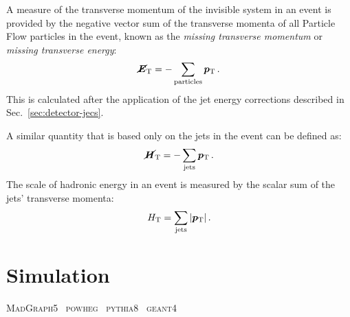 A measure of the transverse momentum of the invisible system in an event is 
provided by the negative vector sum of the transverse momenta of all Particle 
Flow particles in the event, known as the \textit{missing transverse momentum} 
or \textit{missing transverse energy}:
\begin{equation}
\bm{\cancel{E}}_\mathrm{T} = - \sum_{\mathrm{particles}} \bm{p}_\mathrm{T} \, .
\end{equation}
This is calculated after the application of the jet energy corrections 
described in Sec.~\ref{sec:detector-jecs}.

A similar quantity that is based only on the jets in the event can be defined 
as:
\begin{equation}
\bm{\cancel{H}}_\mathrm{T} = - \sum_{\mathrm{jets}} \bm{p}_\mathrm{T} \, .
\end{equation}
The scale of hadronic energy in an event is measured by the scalar sum of the 
jets' transverse momenta:
\begin{equation}
\mbox{$H_\text{T}$} = \sum_{\mathrm{jets}} |\bm{p}_\mathrm{T}| \, .
\end{equation}

\section{Simulation}
\label{sec:detector-simulation}

\textsc{MadGraph5}~\cite{madgraph}
\textsc{powheg}~\cite{powheg}
\textsc{pythia8}~\cite{pythia}
\textsc{geant4}~\cite{geant}

